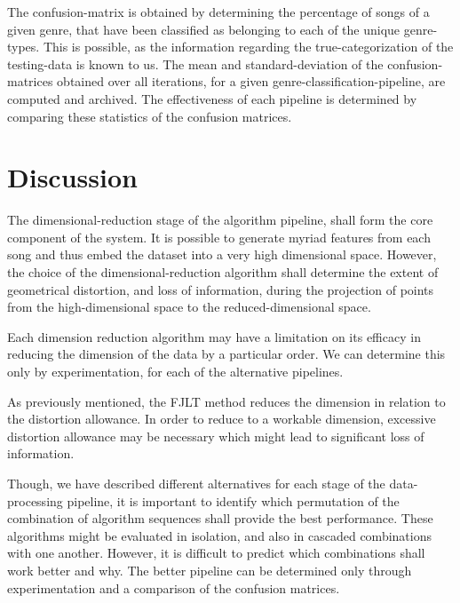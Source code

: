 \documentclass[12pt]{article}
\begin{document}
The confusion-matrix is obtained by determining the percentage of songs of a given genre, that have been classified as belonging to each of the unique genre-types. This is possible, as the information regarding the true-categorization of the testing-data is known to us.   The mean and standard-deviation of the confusion-matrices obtained over all iterations, for a given genre-classification-pipeline, are computed and archived. The effectiveness of each pipeline is determined by comparing these statistics of the confusion matrices. 

\section{Discussion}

The dimensional-reduction stage of the algorithm pipeline, shall form the core component of the system. It is possible to generate myriad features from each song and thus embed the dataset into a very high dimensional space. However, the choice of the dimensional-reduction algorithm shall determine the extent of geometrical distortion, and loss of information, during the projection of points from the high-dimensional space to the reduced-dimensional space. 

Each dimension reduction algorithm may have a limitation on its efficacy in reducing the dimension of the data by a particular order. We can determine this only by experimentation, for each of the alternative pipelines. 

As previously mentioned, the FJLT method reduces the dimension in relation to the distortion allowance.  In order to reduce to a workable dimension, excessive distortion allowance may be necessary which might lead to significant loss of information.

Though, we have described different alternatives for each stage of the data-processing pipeline, it is important to identify which permutation of the combination of algorithm sequences shall provide the best performance. These algorithms might be evaluated in isolation, and also in cascaded combinations with one another. However, it is difficult to predict which combinations shall work better and why. The better pipeline can be determined only through experimentation and a comparison of the confusion matrices. 
\end{document}
